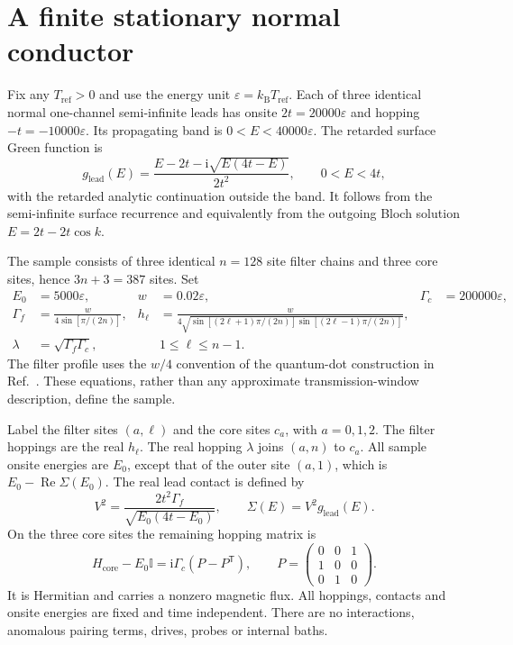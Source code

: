 \documentclass[11pt,a4paper]{article}
\newcommand{\kb}{k_{\mathrm B}}
\newcommand{\ee}{\varepsilon}
\newcommand{\ii}{\mathrm i}
\begin{document}
\section{A finite stationary normal conductor}
\label{sec:model}

Fix any $T_{\mathrm{ref}}>0$ and use the energy unit
$\ee=\kb T_{\mathrm{ref}}$. Each of three identical normal
one-channel semi-infinite leads has onsite $2t=20000\ee$ and hopping
$-t=-10000\ee$. Its propagating band is $0<E<40000\ee$.
The retarded surface Green function is
\begin{equation}
 g_{\mathrm{lead}}(E)=
 \frac{E-2t-\ii\sqrt{E(4t-E)}}{2t^2},\qquad 0<E<4t,
 \label{eq:surface}
\end{equation}
with the retarded analytic continuation outside the band. It follows from
the semi-infinite surface recurrence and equivalently from the outgoing
Bloch solution $E=2t-2t\cos k$.

The sample consists of three identical $n=128$ site filter chains and three
core sites, hence $3n+3=387$ sites. Set
\begin{align}
 E_0&=5000\ee,&w&=0.02\ee,&\Gamma_c&=200000\ee,\nonumber\\
 \Gamma_f&=\frac{w}{4\sin[\pi/(2n)]},&
 h_\ell&=\frac{w}{4\sqrt{\sin[(2\ell+1)\pi/(2n)]
                         \sin[(2\ell-1)\pi/(2n)]}},
 \label{eq:filter}\\
 \lambda&=\sqrt{\Gamma_f\Gamma_c},&&1\le\ell\le n-1.\nonumber
\end{align}
The filter profile uses the $w/4$ convention of the quantum-dot construction
in Ref.~\cite{BrandnerSaitoPRL2025}. These equations, rather than any
approximate transmission-window description, define the sample.

Label the filter sites $(a,\ell)$ and the core sites $c_a$, with $a=0,1,2$.
The filter hoppings are the real $h_\ell$. The real hopping $\lambda$ joins
$(a,n)$ to $c_a$. All sample onsite energies are $E_0$, except that of the
outer site $(a,1)$, which is $E_0-\operatorname{Re}\Sigma(E_0)$. The real
lead contact is defined by
\begin{equation}
 V^2=\frac{2t^2\Gamma_f}{\sqrt{E_0(4t-E_0)}},\qquad
 \Sigma(E)=V^2 g_{\mathrm{lead}}(E).
 \label{eq:contact}
\end{equation}
On the three core sites the remaining hopping matrix is
\begin{equation}
 H_{\mathrm{core}}-E_0\mathbb I=\ii\Gamma_c(P-P^{\mathsf T}),
 \qquad P=\begin{pmatrix}0&0&1\\1&0&0\\0&1&0\end{pmatrix}.
 \label{eq:core}
\end{equation}
It is Hermitian and carries a nonzero magnetic flux. All hoppings, contacts
and onsite energies are fixed and time independent. There are no
interactions, anomalous pairing terms, drives, probes or internal baths.
\end{document}
